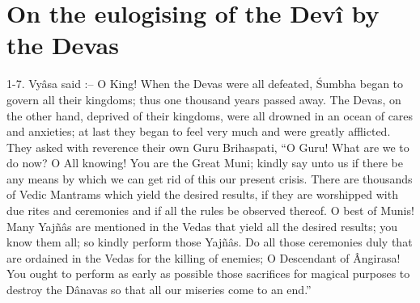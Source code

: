 ﻿\chapter{On the eulogising of the Dev\^i by the Devas}

1-7. Vy\^asa said :-- O King! When the Devas were all defeated, \'Sumbha began to govern all their kingdoms; thus one thousand years passed away. The Devas, on the other hand, deprived of their kingdoms, were all drowned in an ocean of cares and anxieties; at last they began to feel very much and were greatly afflicted. They asked with reverence their own Guru Brihaspati, ``O Guru! What are we to do now? O All knowing! You are the Great Muni; kindly say unto us if there be any means by which we can get rid of this our present crisis. There are thousands of Vedic Mantrams which yield the desired results, if they are worshipped with due rites and ceremonies and if all the rules be observed thereof. O best of Munis! Many Yajñ\^as are mentioned in the Vedas that yield all the desired results; you know them all; so kindly perform those Yajñ\^as. Do all those ceremonies duly that are ordained in the Vedas for the killing of enemies; O Descendant of \^Angirasa! You ought to perform as early as possible those sacrifices for magical purposes to destroy the D\^anavas so that all our miseries come to an end.''

